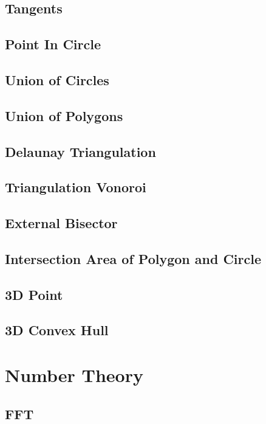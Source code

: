 \documentclass[a4paper,10pt,twocolumn,oneside,x11names]{article}
\begin{document}
\subsection{Tangents}

\subsection{Point In Circle}

\subsection{Union of Circles}

\subsection{Union of Polygons}

\subsection{Delaunay Triangulation}

\subsection{Triangulation Vonoroi}

\subsection{External Bisector}

\subsection{Intersection Area of Polygon and Circle}

\subsection{3D Point}

\subsection{3D Convex Hull}


\section{Number Theory}

\subsection{FFT}

\end{document}
